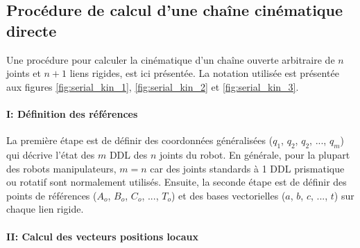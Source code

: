 \subsection{Procédure de calcul d'une chaîne cinématique directe}
\label{sec:cinedirectmethod}

Une procédure pour calculer la cinématique d'un chaîne ouverte arbitraire de $n$ joints et $n+1$ liens rigides, est ici présentée. La notation utilisée est présentée aux figures \ref{fig:serial_kin_1}, \ref{fig:serial_kin_2} et \ref{fig:serial_kin_3}. 


\paragraph{I: Définition des références}

La première étape est de définir des coordonnées généralisées ($q_1$, $q_2$, $q_2$, ..., $q_m$) qui décrive l'état des $m$ DDL des $n$ joints du robot. En générale, pour la plupart des robots manipulateurs, $m=n$ car des joints standards à 1 DDL prismatique ou rotatif sont normalement utilisés. Ensuite, la seconde étape est de définir des points de références ($A_o$, $B_o$, $C_o$, ..., $T_o$) et des bases vectorielles ($a$, $b$, $c$, ..., $t$) sur chaque lien rigide. 


\paragraph{II: Calcul des vecteurs positions locaux}

